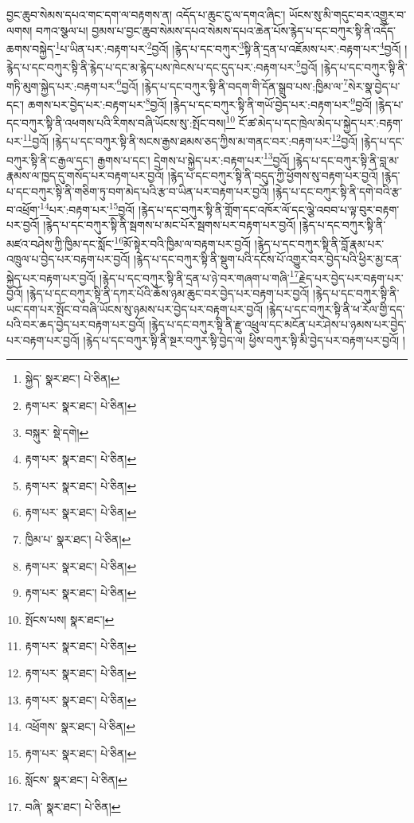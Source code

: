བྱང་ཆུབ་སེམས་དཔའ་གང་དག་ལ་བརྟགས་ན། འདོད་པ་ཆུང་ངུ་ལ་དགའ་ཞིང་། ཡོངས་སུ་མི་གདུང་བར་འགྱུར་བ་ལགས། བཀའ་སྩལ་པ། བྱམས་པ་བྱང་ཆུབ་སེམས་དཔའ་སེམས་དཔའ་ཆེན་པོས་རྙེད་པ་དང་བཀུར་སྟི་ནི་འདོད་ཆགས་བསྐྱེད་\footnote{སྐྱེད་  སྣར་ཐང་།  པེ་ཅིན། }པ་ཡིན་པར་:བརྟག་པར་\footnote{རྟག་པར་  སྣར་ཐང་།  པེ་ཅིན། }བྱའོ། །རྙེད་པ་དང་བཀུར་\footnote{བསྐུར་  སྡེ་དགེ། }སྟི་ནི་དྲན་པ་འཇོམས་པར་:བརྟག་པར་\footnote{རྟག་པར་  སྣར་ཐང་།  པེ་ཅིན། }བྱའོ། །རྙེད་པ་དང་བཀུར་སྟི་ནི་རྙེད་པ་དང་མ་རྙེད་པས་ཁེངས་པ་དང་དུད་པར་:བརྟག་པར་\footnote{རྟག་པར་  སྣར་ཐང་།  པེ་ཅིན། }བྱའོ། །རྙེད་པ་དང་བཀུར་སྟི་ནི་གཏི་མུག་སྐྱེད་པར་:བརྟག་པར་\footnote{རྟག་པར་  སྣར་ཐང་།  པེ་ཅིན། }བྱའོ། །རྙེད་པ་དང་བཀུར་སྟི་ནི་བདག་གི་དོན་སྒྲུབ་པས་:ཁྱིམ་ལ་\footnote{ཁྱིམ་པ་  སྣར་ཐང་།  པེ་ཅིན། }སེར་སྣ་བྱེད་པ་དང་། ཆགས་པར་བྱེད་པར་:བརྟག་པར་\footnote{རྟག་པར་  སྣར་ཐང་།  པེ་ཅིན། }བྱའོ། །རྙེད་པ་དང་བཀུར་སྟི་ནི་གཡོ་བྱེད་པར་:བརྟག་པར་\footnote{རྟག་པར་  སྣར་ཐང་།  པེ་ཅིན། }བྱའོ། །རྙེད་པ་དང་བཀུར་སྟི་ནི་འཕགས་པའི་རིགས་བཞི་ཡོངས་སུ་:སྤོང་བས།\footnote{སྤོངས་པས།  སྣར་ཐང་། } ངོ་ཚ་མེད་པ་དང་ཁྲེལ་མེད་པ་སྐྱེད་པར་:བརྟག་པར་\footnote{རྟག་པར་  སྣར་ཐང་།  པེ་ཅིན། }བྱའོ། །རྙེད་པ་དང་བཀུར་སྟི་ནི་སངས་རྒྱས་ཐམས་ཅད་ཀྱིས་མ་གནང་བར་:བརྟག་པར་\footnote{རྟག་པར་  སྣར་ཐང་།  པེ་ཅིན། }བྱའོ། །རྙེད་པ་དང་བཀུར་སྟི་ནི་ང་རྒྱལ་དང་། རྒྱགས་པ་དང་། དྲེགས་པ་སྐྱེད་པར་:བརྟག་པར་\footnote{རྟག་པར་  སྣར་ཐང་།  པེ་ཅིན། }བྱའོ། །རྙེད་པ་དང་བཀུར་སྟི་ནི་བླ་མ་རྣམས་ལ་ཁྱད་དུ་གསོད་པར་བརྟག་པར་བྱའོ། །རྙེད་པ་དང་བཀུར་སྟི་ནི་བདུད་ཀྱི་ཕྱོགས་སུ་བརྟག་པར་བྱའོ། །རྙེད་པ་དང་བཀུར་སྟི་ནི་གཅིག་ཏུ་བག་མེད་པའི་རྩ་བ་ཡིན་པར་བརྟག་པར་བྱའོ། །རྙེད་པ་དང་བཀུར་སྟི་ནི་དགེ་བའི་རྩ་བ་འཕྲོག་\footnote{འཕྲོགས་  སྣར་ཐང་།  པེ་ཅིན། }པར་:བརྟག་པར་\footnote{རྟག་པར་  སྣར་ཐང་།  པེ་ཅིན། }བྱའོ། །རྙེད་པ་དང་བཀུར་སྟི་ནི་གློག་དང་འཁོར་ལོ་དང་ལྕེ་འབབ་པ་ལྟ་བུར་བརྟག་པར་བྱའོ། །རྙེད་པ་དང་བཀུར་སྟི་ནི་སྦགས་པ་མང་པོར་སྦགས་པར་བརྟག་པར་བྱའོ། །རྙེད་པ་དང་བཀུར་སྟི་ནི་མཛའ་བཤེས་ཀྱི་ཁྱིམ་དང་སློང་\footnote{སློངས་  སྣར་ཐང་།  པེ་ཅིན། }མོ་སྟེར་བའི་ཁྱིམ་ལ་བརྟག་པར་བྱའོ། །རྙེད་པ་དང་བཀུར་སྟི་ནི་བློ་རྣམ་པར་འཁྲུལ་པ་བྱེད་པར་བརྟག་པར་བྱའོ། །རྙེད་པ་དང་བཀུར་སྟི་ནི་སྡུག་པའི་དངོས་པོ་འགྱུར་བར་བྱེད་པའི་ཕྱིར་མྱ་ངན་སྐྱེད་པར་བརྟག་པར་བྱའོ། །རྙེད་པ་དང་བཀུར་སྟི་ནི་དྲན་པ་ཉེ་བར་གཞག་པ་གཞི་\footnote{བཞི་  སྣར་ཐང་།  པེ་ཅིན། }རྗེད་པར་བྱེད་པར་བརྟག་པར་བྱའོ། །རྙེད་པ་དང་བཀུར་སྟི་ནི་དཀར་པོའི་ཆོས་ཉམ་ཆུང་བར་བྱེད་པར་བརྟག་པར་བྱའོ། །རྙེད་པ་དང་བཀུར་སྟི་ནི་ཡང་དག་པར་སྤོང་བ་བཞི་ཡོངས་སུ་ཉམས་པར་བྱེད་པར་བརྟག་པར་བྱའོ། །རྙེད་པ་དང་བཀུར་སྟི་ནི་ཕ་རོལ་གྱི་དད་པའི་བར་ཆད་བྱེད་པར་བརྟག་པར་བྱའོ། །རྙེད་པ་དང་བཀུར་སྟི་ནི་རྫུ་འཕྲུལ་དང་མངོན་པར་ཤེས་པ་ཉམས་པར་བྱེད་པར་བརྟག་པར་བྱའོ། །རྙེད་པ་དང་བཀུར་སྟི་ནི་སྔར་བཀུར་སྟི་བྱེད་ལ། ཕྱིས་བཀུར་སྟི་མི་བྱེད་པར་བརྟག་པར་བྱའོ། །

